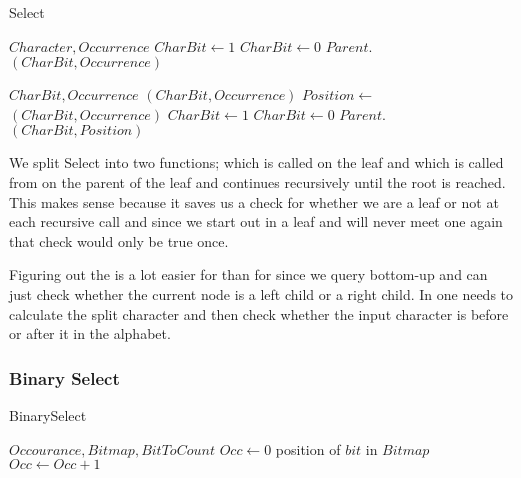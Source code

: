 \begin{algorithm}
\caption{Select}
\label{alg:select}
\begin{algorithmic} 
 {$Character, Occurrence$}
	\State $CharBit \gets 1$
\Else
	\State $CharBit \gets 0$
\EndIf
\State \Return $Parent.$$(CharBit, Occurrence)$
\EndFunction

\vspace{1cm}

 {$CharBit, Occurrence$}
	\State \Return {}$(CharBit, Occurrence)$
\EndIf
\State $Position \gets $$(CharBit, Occurrence)$
	\State $CharBit \gets 1$
\Else
	\State $CharBit \gets 0$
\EndIf
\State \Return $Parent.$$(CharBit, Position)$
\EndFunction
\end{algorithmic}
\end{algorithm}


We split Select into two functions;  which is called on the leaf and  which is called from  on the parent of the leaf and continues recursively until the root is reached. 
This makes sense because it saves us a check for whether we are a leaf or not at each recursive call and since we start out in a leaf and will never meet one again that check would only be true once. 

Figuring out the  is a lot easier for  than for  since we query bottom-up and can just check whether the current node is a left child or a right child. 
In  one needs to calculate the split character and then check whether the input character is before or after it in the alphabet.

\subsubsection{Binary Select}
\begin{algorithm}
\caption{BinarySelect}
\label{alg:binaryselect}
\begin{algorithmic}
 {$Occourance, Bitmap, BitToCount$}
\State $Occ \gets 0$
\State \Return position of $bit$ in $Bitmap$
\EndIf
\State $Occ \gets Occ + 1$
\EndIf
\EndFor
\EndFunction
\end{algorithmic}
\end{algorithm}

